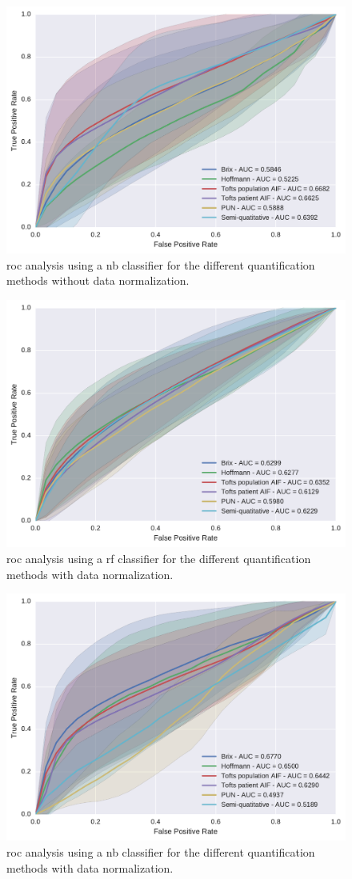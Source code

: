 \begin{figure}
  \centering
  \includegraphics[width=0.7\linewidth]{03_experiments/figures/unormalized/nb.pdf}
  \caption{\acs*{roc} analysis using a \acs*{nb} classifier for the different quantification methods without data normalization.}
  \label{fig:rfunorm}
\end{figure}

\begin{figure}
  \centering
  \includegraphics[width=0.7\linewidth]{03_experiments/figures/normalized/rf.pdf}
  \caption{\acs*{roc} analysis using a \acs*{rf} classifier for the different quantification methods with data normalization.}
  \label{fig:rfunorm}
\end{figure}

\begin{figure}
  \centering
  \includegraphics[width=0.7\linewidth]{03_experiments/figures/normalized/nb.pdf}
  \caption{\acs*{roc} analysis using a \acs*{nb} classifier for the different quantification methods with data normalization.}
  \label{fig:rfunorm}
\end{figure}

